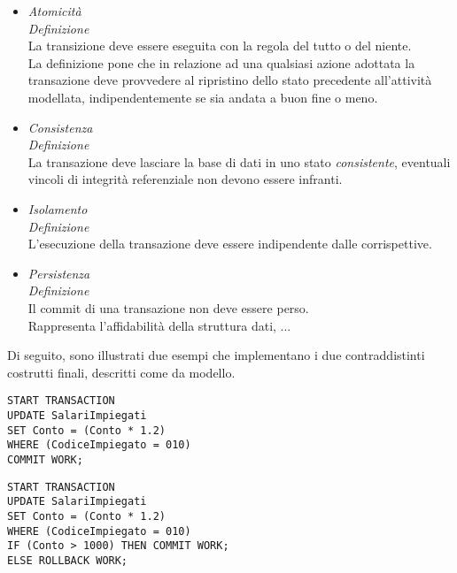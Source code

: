 \documentclass{article}
\begin{document}
\begin{itemize}[label={-}]
    \itemsep0em
    \item \textit{Atomicità}\vspace*{7pt}\\ \textit{Definizione}\\La transizione deve essere eseguita con la regola del tutto o del niente.\vspace*{7pt}\\ La definizione pone che in relazione ad una qualsiasi azione adottata la transazione deve provvedere al ripristino dello stato precedente all'attività modellata, indipendentemente se sia andata a buon fine o meno.
    \item \textit{Consistenza}\vspace*{7pt}\\ \textit{Definizione}\\La transazione deve lasciare la base di dati in uno stato \textit{consistente}, eventuali vincoli di integrità referenziale non devono essere infranti.
    \item \textit{Isolamento}\vspace*{7pt}\\ \textit{Definizione}\\L'esecuzione della transazione deve essere indipendente dalle corrispettive.
    \item \textit{Persistenza}\vspace*{7pt}\\ \textit{Definizione}\\Il commit di una transazione non deve essere perso.\vspace*{14pt}\\Rappresenta l'affidabilità della struttura dati, ... 
\end{itemize}
Di seguito, sono illustrati due esempi che implementano i due contraddistinti costrutti finali, descritti come da modello.\vspace*{14pt}\\
\begin{minipage}{\textwidth}
    \begin{lstlisting}
START TRANSACTION
UPDATE SalariImpiegati
SET Conto = (Conto * 1.2)
WHERE (CodiceImpiegato = 010)
COMMIT WORK;
    \end{lstlisting}
\end{minipage}\vspace*{14pt}
\begin{minipage}{\textwidth}
    \begin{lstlisting}
START TRANSACTION
UPDATE SalariImpiegati
SET Conto = (Conto * 1.2)
WHERE (CodiceImpiegato = 010)
IF (Conto > 1000) THEN COMMIT WORK;
ELSE ROLLBACK WORK;
    \end{lstlisting}
\end{minipage}\vspace*{14pt}
\end{document}
